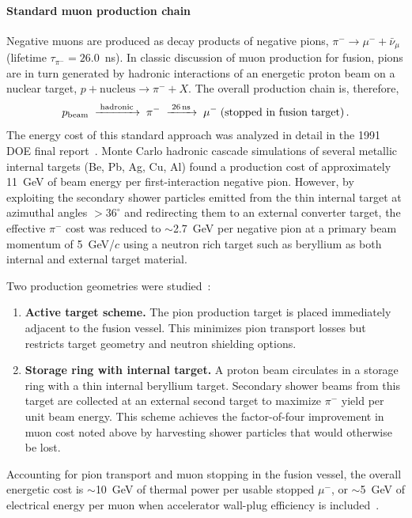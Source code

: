 \documentclass[particles,article,accept,pdftex,moreauthors]{Definitions/mdpi}
\newcommand{\rsec}[1]{Section~\ref{#1}}
\begin{document}
\paragraph*{\bf Standard muon production chain}
Negative muons are produced as decay products of negative pions, $\pi^-\to\mu^-+\bar\nu_\mu$ (lifetime $\tau_{\pi^-}=26.0$~ns). In classic discussion of muon production for fusion, pions are in turn generated by hadronic interactions of an energetic proton beam on a nuclear target, $p+\mathrm{nucleus}\to \pi^-+X$. The overall production chain is, therefore,
\begin{equation}
p_{\rm beam}\;\xrightarrow{\;\rm hadronic\;}\;\pi^-\;\xrightarrow{\;26\,\mathrm{ns}\;}\;\mu^-\;(\text{stopped in fusion target})\,.
\end{equation}
The energy cost of this standard approach was analyzed in detail in the 1991 DOE final report~\cite{Rafelski:1991DOE}. Monte Carlo hadronic cascade simulations of several metallic internal targets (Be, Pb, Ag, Cu, Al) found a production cost of approximately 11~GeV of beam energy per first-interaction negative pion. However, by exploiting the secondary shower particles emitted from the thin internal target at azimuthal angles $>36^\circ$ and redirecting them to an external converter target, the effective $\pi^-$ cost was reduced to $\sim$2.7~GeV per negative pion at a primary beam momentum of 5~GeV/$c$ using a neutron rich target such as beryllium as both internal and external target material.

Two production geometries were studied~\cite{Rafelski:1991DOE}:
\begin{enumerate}[label=(\arabic*),nosep]
\item \textbf{Active target scheme.} The pion production target is placed immediately adjacent to the fusion vessel. This minimizes pion transport losses but restricts target geometry and neutron shielding options.
\item \textbf{Storage ring with internal target.} A proton beam circulates in a storage ring with a thin internal beryllium target. Secondary shower beams from this target are collected at an external second target to maximize $\pi^-$ yield per unit beam energy. This scheme
achieves the factor-of-four improvement in muon cost noted above by harvesting shower particles that would otherwise be lost.
\end{enumerate}
Accounting for pion transport and muon stopping in the fusion vessel, the overall energetic cost is $\sim$10~GeV of thermal power per usable stopped $\mu^-$, or $\sim$5~GeV of electrical energy per muon when accelerator wall-plug efficiency is included~\cite{Rafelski:1990in,Rafelski:1991DOE}.
\end{document}
